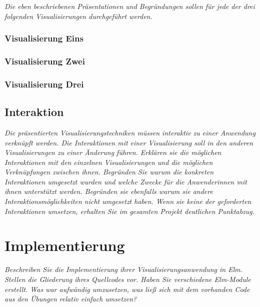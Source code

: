 \documentclass[usegeometry=true]{scrartcl}
\begin{document}
\textit{Die eben beschriebenen Präsentationen und Begründungen sollen für jede der drei folgenden Visualisierungen durchgeführt werden. 
}

\subsubsection{Visualisierung Eins}
\subsubsection{Visualisierung Zwei}
\subsubsection{Visualisierung Drei}

\subsection{Interaktion}
\textit{Die präsentierten Visualisierungstechniken müssen interaktiv zu einer Anwendung verknüpft werden.
Die Interaktionen mit einer Visualisierung soll in den anderen Visualisierungen zu einer Änderung führen. 
Erklären sie die möglichen Interaktionen mit den einzelnen Visualisierungen und die möglichen Verknüpfungen zwischen ihnen. Begründen Sie warum die konkreten Interaktionen umgesetzt wurden und welche Zwecke für die Anwenderinnen mit ihnen unterstützt werden. Begründen sie ebenfalls warum sie andere Interaktionsmöglichkeiten nicht umgesetzt haben. Wenn sie keine der geforderten Interaktionen umsetzen, erhalten Sie im gesamten Projekt deutlichen Punktabzug. 
}


\section{Implementierung}
\textit{Beschreiben Sie die Implementierung ihrer Visualisierungsanwendung in Elm. Stellen die Gliederung ihres Quellcodes vor. Haben Sie verschiedene Elm-Module erstellt. Was war aufwändig umzusetzen, was ließ sich mit dem vorhanden Code aus den Übungen relativ einfach umsetzen? 
}
\end{document}
